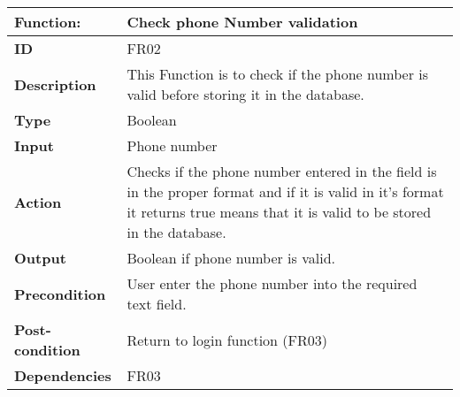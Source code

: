 \documentclass[]{article}
\begin{document}
\FloatBarrier
\begin{table}[h]
\caption{ }
\label{tab:my-table}
\begin{tabular}{|p{}|p{}|}
\hline
\textbf{Function:} & Check phone Number validation
\\ \hline
\textbf{ID}  &            FR02

\\ \hline
\textbf{Description}    &     This Function is to check if the phone number is valid before storing it in the database.                                                                
\\ \hline
\textbf{Type}    &       Boolean  

\\ \hline
\textbf{Input}        & Phone number


\\ \hline
\textbf{Action}            & Checks if the phone number entered in the  field  is in the proper format and  if it is valid in it's format it returns true means that it is valid to be stored in the database.

\\ \hline
\textbf{Output}            & Boolean if phone number is valid.

\\ \hline
\textbf{Precondition}           &   User enter the phone number into the required text field.

\\ \hline
\textbf{Post-condition}           & Return to login function (FR03)


\\ \hline
\textbf{Dependencies}           & FR03
\\ \hline
\end{tabular}
\end{table}
\end{document}
